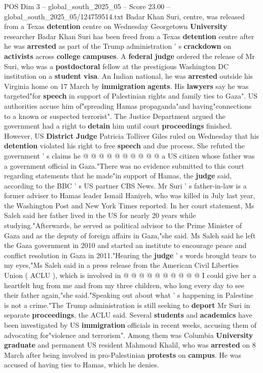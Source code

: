 \begin{textsample}{POS Dim 3 – global\_south\_2025\_05 – Score 23.00 – global\_south\_2025\_05/124759514.txt}  \label{ex:f3_pos_230}
Badar Khan Suri, centre, was released from a Texas \textbf{detention} centre on Wednesday Georgetown \textbf{University} researcher Badar Khan Suri has been freed from a Texas \textbf{detention} centre after he was \textbf{arrested} as part of the Trump administration ' s \textbf{crackdown} on \textbf{activists} across \textbf{college} \textbf{campuses}.
A \textbf{federal} \textbf{judge} ordered the release of Mr Suri, who was a \textbf{postdoctoral} fellow at the prestigious Washington DC institution on a \textbf{student} \textbf{visa}.
An Indian national, he was \textbf{arrested} outside his Virginia home on 17 March by \textbf{immigration} \textbf{agents}.
His \textbf{lawyers} say he was targeted"for \textbf{speech} in support of Palestinian rights and family ties to Gaza".
US authorities accuse him of"spreading Hamas propaganda"and having"connections to a known or suspected terrorist".
The Justice Department argued the government had a right to \textbf{detain} him until court \textbf{proceedings} finished.
However, US \textbf{District} \textbf{Judge} Patricia Tolliver Giles ruled on Wednesday that his \textbf{detention} violated his right to free \textbf{speech} and due process.
She refuted the government ' s claims he @ @ @ @ @ @ @ @ @ @ a US citizen whose father was a government official in Gaza."There was no evidence submitted to this court regarding statements that he made"in support of Hamas, the \textbf{judge} said, according to the BBC ' s US partner CBS News.
Mr Suri ' s father-in-law is a former adviser to Hamas leader Ismail Haniyeh, who was killed in July last year, the Washington Post and New York Times reported.
In her court statement, Ms Saleh said her father lived in the US for nearly 20 years while studying."Afterwards, he served as political advisor to the Prime Minister of Gaza and as the deputy of foreign affairs in Gaza,"she said.
Ms Saleh said he left the Gaza government in 2010 and started an institute to encourage peace and conflict resolution in Gaza in 2011."Hearing the \textbf{judge} ' s words brought tears to my eyes,"Ms Saleh said in a press release from the American Civil Liberties Union ( ACLU ), which is involved in @ @ @ @ @ @ @ @ @ @ I could give her a heartfelt hug from me and from my three children, who long every day to see their father again,"she said."Speaking out about what ' s happening in Palestine is not a crime."The Trump administration is still seeking to \textbf{deport} Mr Suri in separate \textbf{proceedings}, the ACLU said.
Several \textbf{students} and \textbf{academics} have been investigated by US \textbf{immigration} officials in recent weeks, accusing them of advocating for"violence and terrorism".
Among them was Columbia \textbf{University} \textbf{graduate} and permanent US resident Mahmoud Khalil, who was \textbf{arrested} on 8 March after being involved in pro-Palestinian \textbf{protests} on \textbf{campus}.
He was accused of having ties to Hamas, which he denies.

\end{textsample}
